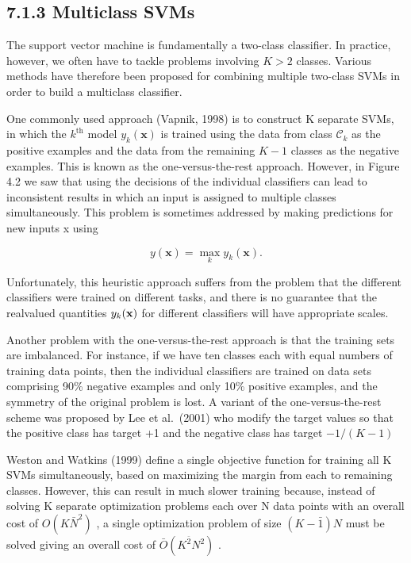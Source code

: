 \documentclass[
  10
]{article}
\begin{document}
\subsection{7.1.3 Multiclass SVMs}\label{multiclass-svms}

The support vector machine is fundamentally a two-class classifier. In
practice, however, we often have to tackle problems involving \(K > 2\)
classes. Various methods have therefore been proposed for combining
multiple two-class SVMs in order to build a multiclass classifier.

One commonly used approach (Vapnik, 1998) is to construct K separate
SVMs, in which the \(k ^ { \mathrm { t h } }\) model
\(y _ { k } ( \mathbf { x } )\) is trained using the data from class
\(\mathcal { C } _ { k }\) as the positive examples and the data from
the remaining \(K - 1\) classes as the negative examples. This is known
as the one-versus-the-rest approach. However, in Figure 4.2 we saw that
using the decisions of the individual classifiers can lead to
inconsistent results in which an input is assigned to multiple classes
simultaneously. This problem is sometimes addressed by making
predictions for new inputs x using

\[
y (\mathbf {x}) = \max _ {k} y _ {k} (\mathbf {x}).\tag{7.49}
\]

Unfortunately, this heuristic approach suffers from the problem that the
different classifiers were trained on different tasks, and there is no
guarantee that the realvalued quantities \(y _ { k } ( { \bf x } )\) for
different classifiers will have appropriate scales.

Another problem with the one-versus-the-rest approach is that the
training sets are imbalanced. For instance, if we have ten classes each
with equal numbers of training data points, then the individual
classifiers are trained on data sets comprising 90\% negative examples
and only 10\% positive examples, and the symmetry of the original
problem is lost. A variant of the one-versus-the-rest scheme was
proposed by Lee et al.~(2001) who modify the target values so that the
positive class has target +1 and the negative class has target
\(- 1 / ( K - 1 )\)

Weston and Watkins (1999) define a single objective function for
training all K SVMs simultaneously, based on maximizing the margin from
each to remaining classes. However, this can result in much slower
training because, instead of solving K separate optimization problems
each over N data points with an overall cost of
\(O ( K { \bar { N } } ^ { 2 } )\) , a single optimization problem of
size \(( K - \bar { 1 } ) N\) must be solved giving an overall cost of
\({ \bar { O } } ( K ^ { \bar { 2 } } N ^ { 2 } )\) .
\end{document}
